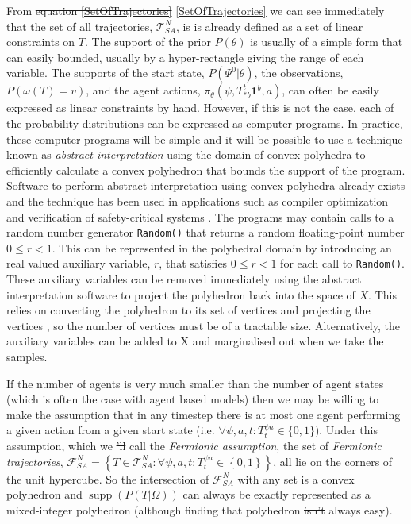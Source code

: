 \documentclass{article}
\DeclareMathOperator\supp{supp}
\providecommand{\DIFaddtex}[1]{{\protect\color{blue}\uwave{#1}}} %
\providecommand{\DIFdeltex}[1]{{\protect\color{red}\sout{#1}}}                      %
\providecommand{\DIFaddbegin}{} %
\providecommand{\DIFaddend}{} %
\providecommand{\DIFdelbegin}{} %
\providecommand{\DIFdelend}{} %
\providecommand{\DIFadd}[1]{\texorpdfstring{\DIFaddtex{#1}}{#1}} %
\providecommand{\DIFdel}[1]{\texorpdfstring{\DIFdeltex{#1}}{}} %
\newcommand{\DIFscaledelfig}{0.5}
\newlength{\DIFdelgraphicswidth} %
\newlength{\DIFdelgraphicsheight} %
\newcommand{\DIFaddincludegraphics}[2][]{{\color{blue}\fbox{\DIFOincludegraphics[#1]{#2}}}} %
\newcommand{\DIFdelincludegraphics}[2][]{%
\sbox{\DIFdelgraphicsbox}{\DIFOincludegraphics[#1]{#2}}%
\settoboxwidth{\DIFdelgraphicswidth}{\DIFdelgraphicsbox} %
\settoboxtotalheight{\DIFdelgraphicsheight}{\DIFdelgraphicsbox} %
\scalebox{\DIFscaledelfig}{%
\parbox[b]{\DIFdelgraphicswidth}{\usebox{\DIFdelgraphicsbox}\\[-\baselineskip] \rule{\DIFdelgraphicswidth}{0em}}\llap{\resizebox{\DIFdelgraphicswidth}{\DIFdelgraphicsheight}{%
\setlength{\unitlength}{\DIFdelgraphicswidth}%
\begin{picture}(1,1)%
\thicklines\linethickness{2pt} %
{\color[rgb]{1,0,0}\put(0,0){\framebox(1,1){}}}%
{\color[rgb]{1,0,0}\put(0,0){\line( 1,1){1}}}%
{\color[rgb]{1,0,0}\put(0,1){\line(1,-1){1}}}%
\end{picture}%
}\hspace*{3pt}}} %
} %
\DeclareRobustCommand{\DIFaddbegin}{\DIFOaddbegin \let\includegraphics\DIFaddincludegraphics} %
\DeclareRobustCommand{\DIFaddend}{\DIFOaddend \let\includegraphics\DIFOincludegraphics} %
\DeclareRobustCommand{\DIFdelbegin}{\DIFOdelbegin \let\includegraphics\DIFdelincludegraphics} %
\DeclareRobustCommand{\DIFdelend}{\DIFOaddend \let\includegraphics\DIFOincludegraphics} %
\begin{document}
From \DIFdelbegin \DIFdel{equation \ref{SetOfTrajectories} }\DIFdelend \DIFaddbegin \eqref{SetOfTrajectories} \DIFaddend we can see immediately that the set of all trajectories, $\mathcal{T}^N_{SA}$, is is already defined as a set of linear constraints on $T$. The support of the prior $P(\theta)$ is usually of a simple form that can easily bounded, usually by a hyper-rectangle giving the range of each variable. The supports of the start state, $P(\Psi^0|\theta)$, the observations, $P(\omega(T)=v)$, and the agent actions, $\pi_\theta(\psi,T^t_{*b}\mathbf{1}^b,a)$, can often be easily expressed as linear constraints by hand. However, if this is not the case, each of the probability distributions can be expressed as computer programs. In practice, these computer programs will be simple and it will be possible to use a technique known as \textit{abstract interpretation} \citep{cousot1977abstract} using the domain of convex polyhedra \citep*{cousot1978automatic, becchi2018efficient, fukuda2020polyhedral} to efficiently calculate a convex polyhedron that bounds the support of the program. Software to perform abstract interpretation using convex polyhedra already exists \citep*{henry2012pagai, GN2021, jeannet2009apron, bagnara2008parma} and the technique has been used in applications such as compiler optimization \citep{nsjodin2009design} and verification of safety-critical systems \citep{halbwachs1997verification}. The programs may contain calls to a random number generator \texttt{Random()} that returns a random floating-point number $0 \le r < 1$. This can be represented in the polyhedral domain by introducing an real valued auxiliary variable, $r$, that satisfies $0 \le r < 1$ for each call to \texttt{Random()}. These auxiliary variables can be removed immediately using the abstract interpretation software to project the polyhedron back into the space of $X$. This relies on converting the polyhedron to its set of vertices \citep{motzkin1953double} and projecting the vertices \DIFdelbegin \DIFdel{, }\DIFdelend so the number of vertices must be of a tractable size. Alternatively, the auxiliary variables can be added to X and marginalised out when we take the samples.

If the number of agents is very much smaller than the number of agent states (which is often the case with \DIFdelbegin \DIFdel{agent based }\DIFdelend \DIFaddbegin \DIFadd{agent-based }\DIFaddend models) then we may be willing to make the assumption that in any timestep there is at most one agent performing a given action from a given start state (i.e. $\forall \psi, a, t: T^{\psi a}_t \in \{0,1\}$). Under this assumption, which we \DIFdelbegin \DIFdel{'ll }\DIFdelend call the \textit{Fermionic assumption}, the set of \textit{Fermionic trajectories}, $\mathcal{F}^N_{SA} = \left\{T\in\mathcal{T}^N_{SA}: \forall \psi, a, t: T^{\psi a}_t \in \left\{0,1\right\}\right\}$, all lie on the corners of the unit hypercube. So the intersection of $\mathcal{F}^N_{SA}$ with any set is a convex polyhedron and $\supp(P(T|\Omega))$ can always be exactly represented as a mixed-integer polyhedron (although finding that polyhedron \DIFdelbegin \DIFdel{isn't }\DIFdelend \DIFaddbegin \DIFadd{is not }\DIFaddend always easy).
\end{document}
